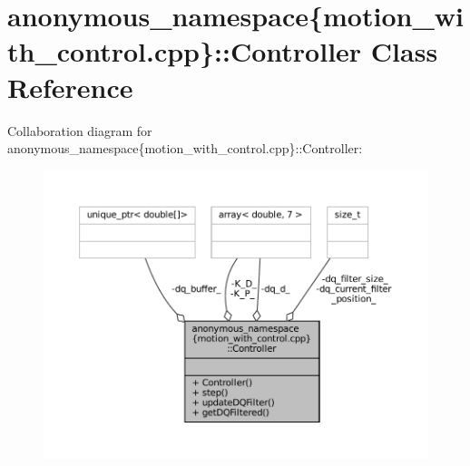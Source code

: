 \hypertarget{classanonymous__namespace_02motion__with__control_8cpp_03_1_1Controller}{}\section{anonymous\+\_\+namespace\{motion\+\_\+with\+\_\+control.\+cpp\}\+:\+:Controller Class Reference}
\label{classanonymous__namespace_02motion__with__control_8cpp_03_1_1Controller}


Collaboration diagram for anonymous\+\_\+namespace\{motion\+\_\+with\+\_\+control.\+cpp\}\+:\+:Controller\+:
\nopagebreak
\begin{figure}[H]
\begin{center}
\leavevmode
\includegraphics[width=350pt]{classanonymous__namespace_02motion__with__control_8cpp_03_1_1Controller__coll__graph}
\end{center}
\end{figure}

